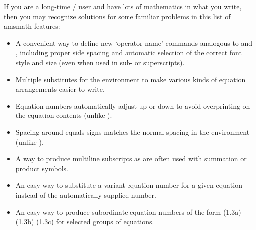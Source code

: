 \documentclass[leqno,titlepage,openany]{amsldoc}[1999/12/13]
\makeatletter
\newcommand{\nipkg}{\textsf}
\let\oldcs\cs
\def\cs#1{\texorpdfstring{\oldcs{#1}}{\@backslashchar\@backslashchar#1}}
\let\cn\cs
\makeatother
\begin{document}
If you are a long-time \latex/ user and have lots of mathematics in what
you write, then you may recognize solutions for some familiar problems
in this list of \nipkg{amsmath} features:
\begin{itemize}

\item A convenient way to define new `operator name' commands analogous
to \cn{sin} and \cn{lim}, including proper side spacing and automatic
selection of the correct font style and size (even when used in
sub- or superscripts).

\item Multiple substitutes for the  environment to make
various kinds of equation arrangements easier to write.

\item Equation numbers automatically adjust up or down to avoid
overprinting on the equation contents (unlike ).

\item Spacing around equals signs matches the normal spacing in the
 environment (unlike ).

\item A way to produce multiline subscripts as are often used with
summation or product symbols.

\item An easy way to substitute a variant equation number for a given
equation instead of the automatically supplied number.

\item An easy way to produce subordinate equation numbers of the form
(1.3a) (1.3b) (1.3c) for selected groups of equations.

\end{itemize}
\end{document}
